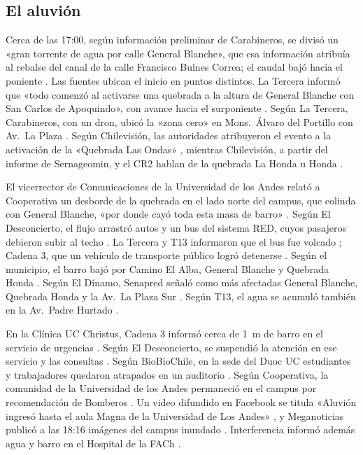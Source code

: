 \subsection*{El aluvión}
Cerca de las 17:00, según información preliminar de Carabineros, se divisó un «gran torrente de agua por calle General Blanche», que esa información atribuía al rebalse del canal de la calle Francisco Bulnes Correa; el caudal bajó hacia el poniente \citep{theclinic2026frontal,eldesconcierto2026}. Las fuentes ubican el inicio en puntos distintos. La Tercera informó que «todo comenzó al activarse una quebrada a la altura de General Blanche con San Carlos de Apoquindo», con avance hacia el surponiente \citep{latercera2026}. Según La Tercera, Carabineros, con un dron, ubicó la «zona cero» en Mons.\ Álvaro del Portillo con Av.\ La Plaza \citep{latercera2026zonacero}. Según Chilevisión, las autoridades atribuyeron el evento a la activación de la «Quebrada Las Ondas» \citep{chilevision2026mapa}, mientras Chilevisión, a partir del informe de Sernageomin, y el CR2 hablan de la quebrada La Honda u Honda \citep{chilevision2026,cr2_2026}.

El vicerrector de Comunicaciones de la Universidad de los Andes relató a Cooperativa un desborde de la quebrada en el lado norte del campus, que colinda con General Blanche, «por donde cayó toda esta masa de barro» \citep{cooperativa2026}. Según El Desconcierto, el flujo arrastró autos y un bus del sistema RED, cuyos pasajeros debieron subir al techo \citep{eldesconcierto2026}. La Tercera y T13 informaron que el bus fue volcado \citep{latercera2026,t13_2026vehiculos}; Cadena 3, que un vehículo de transporte público logró detenerse \citep{cadena3_2026}. Según el municipio, el barro bajó por Camino El Alba, General Blanche y Quebrada Honda \citep{latercera2026,chilevision2026mapa}. Según El Dínamo, Senapred señaló como más afectadas General Blanche, Quebrada Honda y la Av.\ La Plaza Sur \citep{eldinamo2026}. Según T13, el agua se acumuló también en la Av.\ Padre Hurtado \citep{t13_2026vehiculos}.

En la Clínica UC Christus, Cadena 3 informó cerca de \SI{1}{m} de barro en el servicio de urgencias \citep{cadena3_2026}. Según El Desconcierto, se suspendió la atención en ese servicio y las consultas \citep{eldesconcierto2026}. Según BioBioChile, en la sede del Duoc UC estudiantes y trabajadores quedaron atrapados en un auditorio \citep{biobio2026duoc}. Según Cooperativa, la comunidad de la Universidad de los Andes permaneció en el campus por recomendación de Bomberos \citep{cooperativa2026}. Un video difundido en Facebook se titula «Aluvión ingresó hasta el aula Magna de la Universidad de Los Andes» \citep{quintaconectado2026}, y Meganoticias publicó a las 18:16 imágenes del campus inundado \citep{meganoticias2026uandes}. Interferencia informó además agua y barro en el Hospital de la FACh \citep{interferencia2026}.


